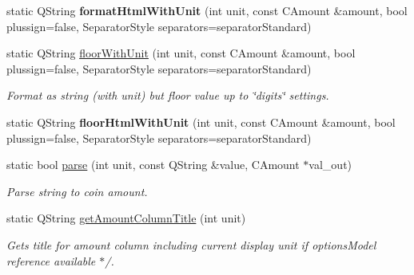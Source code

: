 \begin{Indent}
\begin{DoxyCompactItemize}
static Q\+String {\bfseries format\+Html\+With\+Unit} (int unit, const C\+Amount \&amount, bool plussign=false, Separator\+Style separators=separator\+Standard)
\item 
\mbox{\label{class_bitcoin_units_a27f991fa46140fcdbb59d842996ee711}} 
static Q\+String \mbox{\hyperlink{class_bitcoin_units_a27f991fa46140fcdbb59d842996ee711}{floor\+With\+Unit}} (int unit, const C\+Amount \&amount, bool plussign=false, Separator\+Style separators=separator\+Standard)
\begin{DoxyCompactList}\small\item\em Format as string (with unit) but floor value up to \char`\"{}digits\char`\"{} settings. \end{DoxyCompactList}\item 
\mbox{\label{class_bitcoin_units_a4aa9805ae1c4b512fabf91451945f503}} 
static Q\+String {\bfseries floor\+Html\+With\+Unit} (int unit, const C\+Amount \&amount, bool plussign=false, Separator\+Style separators=separator\+Standard)
\item 
\mbox{\label{class_bitcoin_units_a23b5ed29b71bd5039776e8f3a87d668d}} 
static bool \mbox{\hyperlink{class_bitcoin_units_a23b5ed29b71bd5039776e8f3a87d668d}{parse}} (int unit, const Q\+String \&value, C\+Amount $\ast$val\+\_\+out)
\begin{DoxyCompactList}\small\item\em Parse string to coin amount. \end{DoxyCompactList}\item 
\mbox{\label{class_bitcoin_units_ae15618373f7e2230cb6263a0f06d2180}} 
static Q\+String \mbox{\hyperlink{class_bitcoin_units_ae15618373f7e2230cb6263a0f06d2180}{get\+Amount\+Column\+Title}} (int unit)
\begin{DoxyCompactList}\small\item\em Gets title for amount column including current display unit if options\+Model reference available $\ast$/. \end{DoxyCompactList}\end{DoxyCompactItemize}
\end{Indent}
